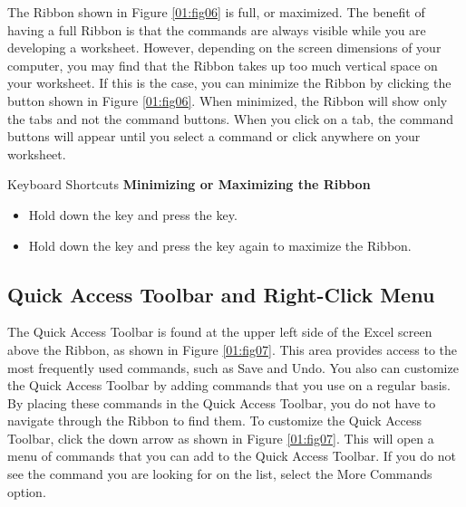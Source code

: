 The Ribbon shown in Figure \ref{01:fig06} is full, or maximized. The benefit of having a full Ribbon is that the commands are always visible while you are developing a worksheet. However, depending on the screen dimensions of your computer, you may find that the Ribbon takes up too much vertical space on your worksheet. If this is the case, you can minimize the Ribbon by clicking the button shown in Figure \ref{01:fig06}. When minimized, the Ribbon will show only the tabs and not the command buttons. When you click on a tab, the command buttons will appear until you select a command or click anywhere on your worksheet.

\begin{center}
	\begin{shtcutbox}{Keyboard Shortcuts}
		\textbf{Minimizing or Maximizing the Ribbon}
		\\
		\begin{itemize}
			\setlength{\itemsep}{0pt}
			\setlength{\parskip}{0pt}
			\setlength{\parsep}{0pt}
			
			\item Hold down the  key and press the  key.
			\item Hold down the  key and press the  key again to maximize the Ribbon.
			
		\end{itemize}
	\end{shtcutbox}
\end{center}

\subsection{Quick Access Toolbar and Right-Click Menu}

The Quick Access Toolbar is found at the upper left side of the Excel screen above the Ribbon, as shown in Figure \ref{01:fig07}. This area provides access to the most frequently used commands, such as Save and Undo. You also can customize the Quick Access Toolbar by adding commands that you use on a regular basis. By placing these commands in the Quick Access Toolbar, you do not have to navigate through the Ribbon to find them. To customize the Quick Access Toolbar, click the down arrow as shown in Figure \ref{01:fig07}. This will open a menu of commands that you can add to the Quick Access Toolbar. If you do not see the command you are looking for on the list, select the More Commands option.

